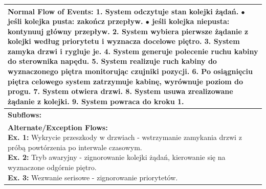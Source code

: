 \documentclass[a4paper,12pt]{article}
\begin{document}
\begin{table}[h]
\begin{tabular}{|p{}|p{}|p{}|}
\multicolumn{3}{|p{0.9\textwidth}|}{\textbf{Normal Flow of Events:} \newline
1. System odczytuje stan kolejki żądań. \newline
\hspace*{10pt} $\bullet$ jeśli kolejka pusta: zakończ przepływ. \newline
\hspace*{10pt} $\bullet$ jeśli kolejka niepusta: kontynuuj główny przepływ. \newline
2. System wybiera pierwsze żądanie z kolejki według priorytetu i wyznacza docelowe piętro. \newline
3. System zamyka drzwi i rygluje je. \newline
4. System generuje polecenie ruchu kabiny do sterownika napędu. \newline
5. System realizuje ruch kabiny do wyznaczonego piętra monitorując czujniki pozycji. \newline
6. Po osiągnięciu piętra celowego system zatrzymuje kabinę, wyrównuje poziom do progu. \newline
7. System otwiera drzwi. \newline
8. System usuwa zrealizowane żądanie z kolejki. \newline
9. System powraca do kroku 1.} \\ \hline
\multicolumn{3}{|p{0.9\textwidth}|}{\textbf{Subflows:} } \\ \hline
\multicolumn{3}{|p{0.9\textwidth}|}{\textbf{Alternate/Exception Flows:} \newline
\textbf{Ex. 1:} Wykrycie przeszkody w drzwiach - wstrzymanie zamykania drzwi z próbą powtórzenia po interwale czasowym. \newline
\textbf{Ex. 2:} Tryb awaryjny - zignorowanie kolejki żądań, kierowanie się na wyznaczone odgórnie piętro. \newline
\textbf{Ex. 3:} Wezwanie serisowe - zignorowanie priorytetów.} \\ \hline

\end{tabular}
\end{table}
\pagebreak
\end{document}
